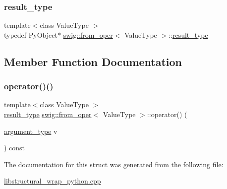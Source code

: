 \mbox{\label{structswig_1_1from__oper_aceed5a894a65b69078106cda841f6021}} 
\subsubsection{\texorpdfstring{result\+\_\+type}{result\_type}}
{\footnotesize\ttfamily template$<$class Value\+Type $>$ \\
typedef Py\+Object$\ast$ \hyperlink{structswig_1_1from__oper}{swig\+::from\+\_\+oper}$<$ Value\+Type $>$\+::\hyperlink{structswig_1_1from__oper_aceed5a894a65b69078106cda841f6021}{result\+\_\+type}}



\subsection{Member Function Documentation}
\mbox{\label{structswig_1_1from__oper_a8c92f4feba24d5a1ee72e2fc25b38ce3}} 
\subsubsection{\texorpdfstring{operator()()}{operator()()}}
{\footnotesize\ttfamily template$<$class Value\+Type $>$ \\
\hyperlink{structswig_1_1from__oper_aceed5a894a65b69078106cda841f6021}{result\+\_\+type} \hyperlink{structswig_1_1from__oper}{swig\+::from\+\_\+oper}$<$ Value\+Type $>$\+::operator() (\begin{DoxyParamCaption}\item[{\hyperlink{structswig_1_1from__oper_a33151174816bb2d002b7b504bcfc1902}{argument\+\_\+type}}]{v }\end{DoxyParamCaption}) const\hspace{0.3cm}{\ttfamily [inline]}}



The documentation for this struct was generated from the following file\+:\begin{DoxyCompactItemize}
\item 
\hyperlink{libstructural__wrap__python_8cpp}{libstructural\+\_\+wrap\+\_\+python.\+cpp}\end{DoxyCompactItemize}
